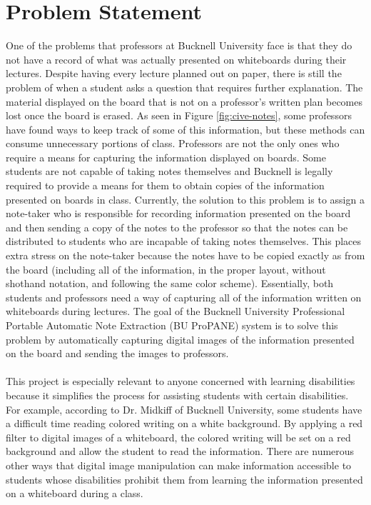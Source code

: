 \documentclass{article}
\begin{document}
	\section{Problem Statement}
		One of the problems that professors at Bucknell University face is that they do not have a record of what was actually presented on whiteboards during their lectures. Despite having every lecture planned out on paper, there is still the problem of when a student asks a question that requires further explanation. The material displayed on the board that is not on a professor's written plan becomes lost once the board is erased. As seen in Figure \ref{fig:cive-notes}, some professors have found ways to keep track of some of this information, but these methods can consume unnecessary portions of class. Professors are not the only ones who require a means for capturing the information displayed on boards. Some students are not capable of taking notes themselves and Bucknell is legally required to provide a means for them to obtain copies of the information presented on boards in class. Currently, the solution to this problem is to assign a note-taker who is responsible for recording information presented on the board and then sending a copy of the notes to the professor so that the notes can be distributed to students who are incapable of taking notes themselves. This places extra stress on the note-taker because the notes have to be copied exactly as from the board (including all of the information, in the proper layout, without shothand notation, and following the same color scheme). Essentially, both students and professors need a way of capturing all of the information written on whiteboards during lectures. The goal of the Bucknell University Professional Portable Automatic Note Extraction (BU ProPANE) system is to solve this problem by automatically capturing digital images of the information presented on the board and sending the images to professors.\\
		\\
		This project is especially relevant to anyone concerned with learning disabilities because it simplifies the process for assisting students with certain disabilities. For example, according to Dr. Midkiff of Bucknell University, some students have a difficult time reading colored writing on a white background. By applying a red filter to digital images of a whiteboard, the colored writing will be set on a red background and allow the student to read the information. There are numerous other ways that digital image manipulation can make information accessible to students whose disabilities prohibit them from learning the information presented on a whiteboard during a class.\\
		\\
		
\end{document}
